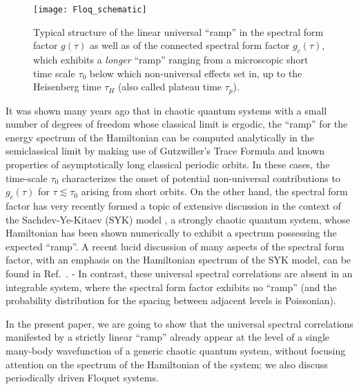 \documentclass[aps,prb,preprint,onecolumn,amsmath,amssymb,superscriptaddress,eqsecnum,floatfix,scrartcl]{revtex4-1}
\begin{document}
\begin{figure}[hbt]
\centering
\texttt{[image: Floq\_schematic]}
\caption{Typical
structure\cite{Note2} of the linear universal  ``ramp''  in the spectral form factor $g(\tau)$ as well as of the connected spectral form factor $g_c(\tau)$, which exhibits a {\it longer} ``ramp'' ranging from a microscopic short  time scale $\tau_0$ below which non-universal effects set in, up to
the Heisenberg time $\tau_H$ (also called plateau time $\tau_p$).
}
\label{fig:fig-sketch-ramp}
\end{figure}
It was shown\cite{BerryProcRoySocLond1985,HannayDeAlmeidaJPhysA17-1984} 
many years ago that in chaotic  quantum systems with a small number of degrees of freedom whose classical
limit is ergodic,  the ``ramp'' for the energy spectrum of the Hamiltonian can be computed analytically in the semiclassical limit by making use of Gutzwiller's
Trace Formula\cite{GutzwillerBook}
 and  known properties of asymptotically  long classical  periodic orbits. In these cases, the time-scale $\tau_0$ characterizes
the onset of potential  non-universal contributions 
to $g_c(\tau)$ for $\tau \lesssim \tau_0$  arising from short 
orbits.
On the other hand,  the spectral form factor has very recently  formed a topic
of extensive discussion  in the context 
 of the Sachdev-Ye-Kitaev (SYK)  model \cite{Sachdev1993,Kitaev2015,Maldacena2016}, a strongly chaotic quantum system, 
whose Hamiltonian   has been shown numerically  to exhibit a spectrum  possessing
 the expected ``ramp''. A recent  lucid  discussion of many aspects of the spectral form factor, with an emphasis on
 the Hamiltonian spectrum of the  SYK model, can be found
in Ref.\ .
-  In contrast, these universal  spectral correlations are   absent in an integrable system, where  the spectral form factor
exhibits no ``ramp'' (and the probability distribution for the spacing between adjacent levels is Poissonian).



In the present paper, we are going to show that
the universal spectral correlations manifested by a  strictly linear ``ramp''
already appear  at the level of a single many-body wavefunction of a generic chaotic quantum system, without focusing
attention on the spectrum of the Hamiltonian of the system; 
we also discuss periodically driven Floquet systems.
\end{document}
